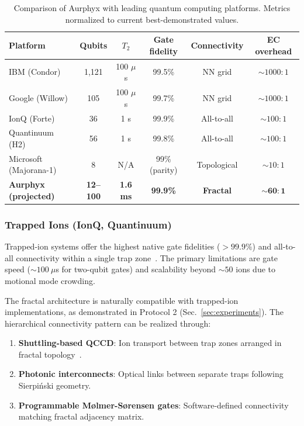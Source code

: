 \begin{table}[h]
\caption{Comparison of Aurphyx with leading quantum computing platforms. Metrics normalized to current best-demonstrated values.}
\label{tab:platform_comparison}
\begin{ruledtabular}
\begin{tabular}{lccccc}
\textbf{Platform} & \textbf{Qubits} & \textbf{$T_2$} & \textbf{Gate fidelity} & \textbf{Connectivity} & \textbf{EC overhead} \\
\hline
IBM (Condor) & 1,121 & 100 $\mu$s & 99.5\% & NN grid & $\sim 1000:1$ \\
Google (Willow) & 105 & 100 $\mu$s & 99.7\% & NN grid & $\sim 1000:1$ \\
IonQ (Forte) & 36 & 1 s & 99.9\% & All-to-all & $\sim 100:1$ \\
Quantinuum (H2) & 56 & 1 s & 99.8\% & All-to-all & $\sim 100:1$ \\
Microsoft (Majorana-1) & 8 & N/A & 99\% (parity) & Topological & $\sim 10:1$ \\
\textbf{Aurphyx (projected)} & \textbf{12--100} & \textbf{1.6 ms} & \textbf{99.9\%} & \textbf{Fractal} & $\mathbf{\sim 60:1}$ \\
\end{tabular}
\end{ruledtabular}
\end{table}

\subsubsection{Trapped Ions (IonQ, Quantinuum)}

Trapped-ion systems offer the highest native gate fidelities ($> 99.9\%$) and all-to-all connectivity within a single trap zone~\cite{Bruzewicz2019}. The primary limitations are gate speed ($\sim 100~\mu$s for two-qubit gates) and scalability beyond $\sim 50$ ions due to motional mode crowding.

The fractal architecture is naturally compatible with trapped-ion implementations, as demonstrated in Protocol 2 (Sec.~\ref{sec:experiments}). The hierarchical connectivity pattern can be realized through:
\begin{enumerate}
\item \textbf{Shuttling-based QCCD}: Ion transport between trap zones arranged in fractal topology~\cite{Pino2021}.
\item \textbf{Photonic interconnects}: Optical links between separate traps following Sierpi\'{n}ski geometry.
\item \textbf{Programmable M{\o}lmer-S{\o}rensen gates}: Software-defined connectivity matching fractal adjacency matrix.
\end{enumerate}

